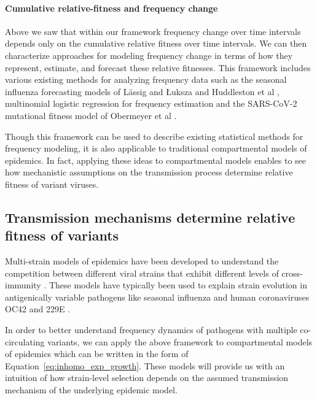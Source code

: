 \documentclass[12pt,oneside,letterpaper]{article}
\begin{document}
\paragraph{Cumulative relative-fitness and frequency change}

Above we saw that within our framework frequency change over time intervals depends only on the cumulative relative fitness over time intervals.
We can then characterize approaches for modeling frequency change in terms of how they represent, estimate, and forecast these relative fitnesses.
This framework includes various existing methods for analyzing frequency data such as the seasonal influenza forecasting models of L{\"a}ssig and {\L}uksza \cite{luksza2014predictive} and Huddleston et al \cite{Huddleston2020}, multinomial logistic regression for frequency estimation \cite{Annavajhala2021} and the SARS-CoV-2 mutational fitness model of Obermeyer et al \cite{Obermeyer2022}.

Though this framework can be used to describe existing statistical methods for frequency modeling, it is also applicable to traditional compartmental models of epidemics.
In fact, applying these ideas to compartmental models enables to see how mechanistic assumptions on the transmission process determine relative fitness of variant viruses.

\subsection*{Transmission mechanisms determine relative fitness of variants}

Multi-strain models of epidemics have been developed to understand the competition between different viral strains that exhibit different levels of cross-immunity \cite{Gog2002, Wen2022}.
These models have typically been used to explain strain evolution in antigenically variable pathogens like seasonal influenza and human coronaviruses OC42 and 229E \cite{Kistler2021, Eguia2021}.

In order to better understand frequency dynamics of pathogens with multiple co-circulating variants, we can apply the above framework to compartmental models of epidemics which can be written in the form of Equation~\ref{eq:inhomo_exp_growth}.
These models will provide us with an intuition of how strain-level selection depends on the assumed transmission mechanism of the underlying epidemic model.
\end{document}

